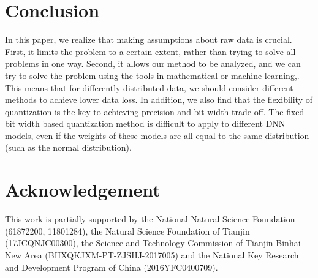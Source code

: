 \section{Conclusion}\label{sec:con}
In this paper, we realize that making assumptions about raw data is crucial. First, it limits the problem to a certain extent, rather than trying to solve all problems in one way. Second, it allows our method to be analyzed, and we can try to solve the problem using the tools in mathematical or machine learning,. This means that for differently distributed data, we should consider different methods to achieve lower data loss. 
In addition, we also find that the flexibility of quantization is the key to achieving precision and bit width trade-off. The fixed bit width based quantization method is difficult to apply to different DNN models, even if the weights of these models are all equal to the same distribution (such as the normal distribution).
\section{Acknowledgement}
This work is partially supported by the National Natural Science Foundation (61872200, 11801284), the Natural Science Foundation of Tianjin (17JCQNJC00300), the Science and Technology Commission of Tianjin Binhai New Area (BHXQKJXM-PT-ZJSHJ-2017005) and the National Key Research and Development Program of China (2016YFC0400709).
